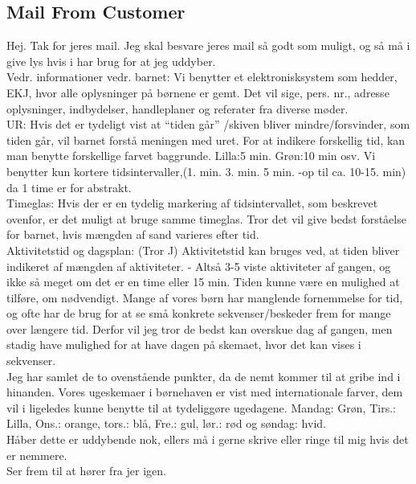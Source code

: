 \subsection{Mail From Customer}
Hej.
Tak for jeres mail.
Jeg skal besvare jeres mail s\aa{} godt som muligt, og s\aa{} m\aa{} i give lys hvis i har brug for at jeg uddyber.
\\
Vedr. informationer vedr. barnet:
Vi benytter et elektronisksystem som hedder, EKJ, hvor alle oplysninger p\aa{} b\o{}rnene er gemt. Det vil sige, pers. nr., adresse oplysninger, indbydelser, handleplaner og referater fra diverse m\o{}der.
 \\
UR: Hvis det er tydeligt vist at ``tiden g\aa{}r'' /skiven bliver mindre/forsvinder, som tiden g\aa{}r, vil barnet forst\aa{} meningen med uret. For at indikere forskellig tid, kan man benytte forskellige farvet baggrunde. Lilla:5 min. Gr\o{}n:10 min osv. Vi benytter kun kortere tidsintervaller,(1. min. 3. min. 5 min. -op til ca. 10-15. min) da 1 time er for abstrakt.
\\
Timeglas: Hvis der er en tydelig markering af tidsintervallet, som beskrevet ovenfor, er det muligt at bruge samme timeglas. Tror det vil give bedst forst\aa{}else for barnet, hvis m\ae{}ngden af sand varieres efter tid. 
\\
Aktivitetstid og dagsplan: (Tror J) Aktivitetstid kan bruges ved, at tiden bliver indikeret af m\ae{}ngden af aktiviteter.
 - Alts\aa{} 3-5 viste aktiviteter af gangen, og ikke s\aa{} meget om det er en time eller 15 min. 
Tiden kunne v\ae{}re en mulighed at tilf\o{}re, om n\o{}dvendigt. Mange af vores b\o{}rn har manglende fornemmelse for tid, og ofte har de brug for at se sm\aa{} konkrete sekvenser/beskeder frem for mange over l\ae{}ngere tid.
Derfor vil jeg tror de bedst kan overskue \textonehalf{} dag af gangen, men stadig have mulighed for at have dagen p\aa{} skemaet, hvor det kan vises i sekvenser.
\\
Jeg har samlet de to ovenst\aa{}ende punkter, da de nemt kommer til at gribe ind i hinanden.
Vores ugeskemaer i b\o{}rnehaven er vist med internationale farver, dem vil i ligeledes kunne benytte til at tydeligg\o{}re ugedagene.
Mandag: Gr\o{}n, Tirs.: Lilla, Ons.: orange, tors.: bl\aa{}, Fre.: gul, l\o{}r.: r\o{}d og s\o{}ndag: hvid.
\\
H\aa{}ber dette er uddybende nok, ellers m\aa{} i gerne skrive eller ringe til mig hvis det er nemmere.
\\
Ser  frem til at h\o{}rer fra jer igen.